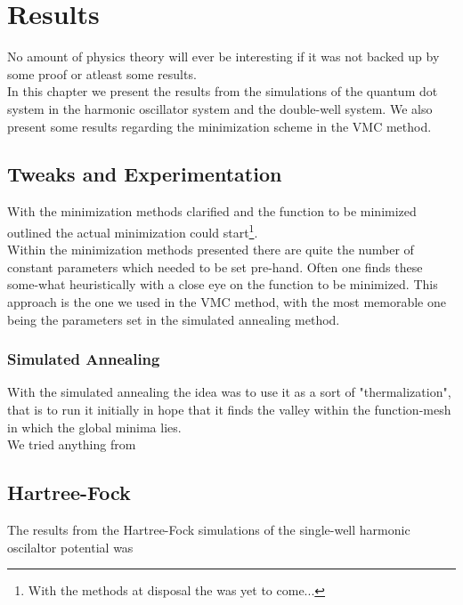 \chapter{Results \label{chapter:6}}
    No amount of physics theory will ever be interesting if it was not backed
    up by some proof or atleast some results. \\
    In this chapter we present the results from the simulations of the quantum
    dot system in the harmonic oscillator system and the double-well system. We
    also present some results regarding the minimization scheme in the VMC
    method.

\section{Tweaks and Experimentation}
    With the minimization methods clarified and the function to be minimized
    outlined the actual minimization could start\footnote{With the methods at
    disposal the  was yet to come...}. \\
    Within the minimization methods presented there are quite the number of
    constant parameters which needed to be set pre-hand. Often one finds these
    some-what heuristically with a close eye on the function to be minimized.
    This approach is the one we used in the VMC method, with the most memorable
    one being the parameters set in the simulated annealing method.

\subsection{Simulated Annealing}
    With the simulated annealing the idea was to use it as a sort of
    "thermalization", that is to run it initially in hope that it finds the
    valley within the function-mesh in which the global minima lies. \\
    We tried anything from 

\section{Hartree-Fock}
    The results from the Hartree-Fock simulations of the single-well harmonic
    oscilaltor potential was

